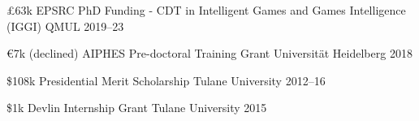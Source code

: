 


\begin{cvhonors}


\cvhonor
{\pounds63k} %
{EPSRC PhD Funding - CDT in Intelligent Games and Games Intelligence (IGGI)} %
{QMUL} %
{2019--23} %

\cvhonor
{€7k (declined)} %
{AIPHES Pre-doctoral Training Grant} %
{Universit{\"a}t Heidelberg} %
{2018} %

\cvhonor
{\$108k} %
{Presidential Merit Scholarship} %
{Tulane University} %
{2012--16} %

\cvhonor
{\$1k} %
{Devlin Internship Grant} %
{Tulane University} %
{2015} %

\end{cvhonors}
